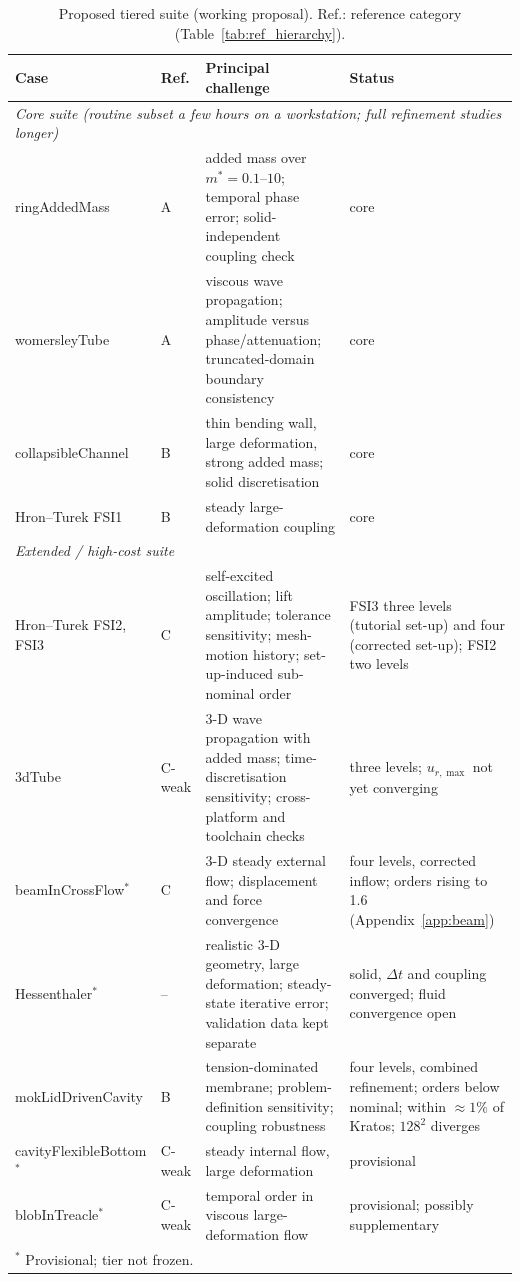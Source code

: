 \begin{table}[htbp]
	\centering
	\footnotesize
	\setlength{\tabcolsep}{3pt}
	\caption{Proposed tiered suite (working proposal). Ref.: reference category (Table~\ref{tab:ref_hierarchy}).}
	\label{tab:suite_tiers}
	\begin{tabular}{p{2.8cm}p{1.1cm}p{6.3cm}p{3.4cm}}
		\toprule
		Case & Ref. & Principal challenge & Status \\
		\midrule
		\multicolumn{4}{l}{\emph{Core suite (routine subset a few hours on a workstation; full refinement studies longer)}} \\
		ringAddedMass & A & added mass over $m^* = 0.1$--$10$; temporal phase error; solid-independent coupling check & core \\
		womersleyTube & A & viscous wave propagation; amplitude versus phase/attenuation; truncated-domain boundary consistency & core \\
		collapsibleChannel & B & thin bending wall, large deformation, strong added mass; solid discretisation & core \\
		Hron--Turek FSI1 & B & steady large-deformation coupling & core \\
		\midrule
		\multicolumn{4}{l}{\emph{Extended / high-cost suite}} \\
		Hron--Turek FSI2, FSI3 & C & self-excited oscillation; lift amplitude; tolerance sensitivity; mesh-motion history; set-up-induced sub-nominal order & FSI3 three levels (tutorial set-up) and four (corrected set-up); FSI2 two levels \\
		3dTube & C-weak & 3-D wave propagation with added mass; time-discretisation sensitivity; cross-platform and toolchain checks & three levels; $u_{r,\max}$ not yet converging \\
		beamInCrossFlow$^\ast$ & C & 3-D steady external flow; displacement and force convergence & four levels, corrected inflow; orders rising to 1.6 (Appendix~\ref{app:beam}) \\
		Hessenthaler$^\ast$ & -- & realistic 3-D geometry, large deformation; steady-state iterative error; validation data kept separate & solid, $\Delta t$ and coupling converged; fluid convergence open \\
		mokLidDrivenCavity & B & tension-dominated membrane; problem-definition sensitivity; coupling robustness & four levels, combined refinement; orders below nominal; within $\approx1\%$ of Kratos; $128^2$ diverges \\
		cavityFlexibleBottom$^\ast$ & C-weak & steady internal flow, large deformation & provisional \\
		blobInTreacle$^\ast$ & C-weak & temporal order in viscous large-deformation flow & provisional; possibly supplementary \\
		\bottomrule
		\multicolumn{4}{l}{$^\ast$ Provisional; tier not frozen.}
	\end{tabular}
\end{table}

